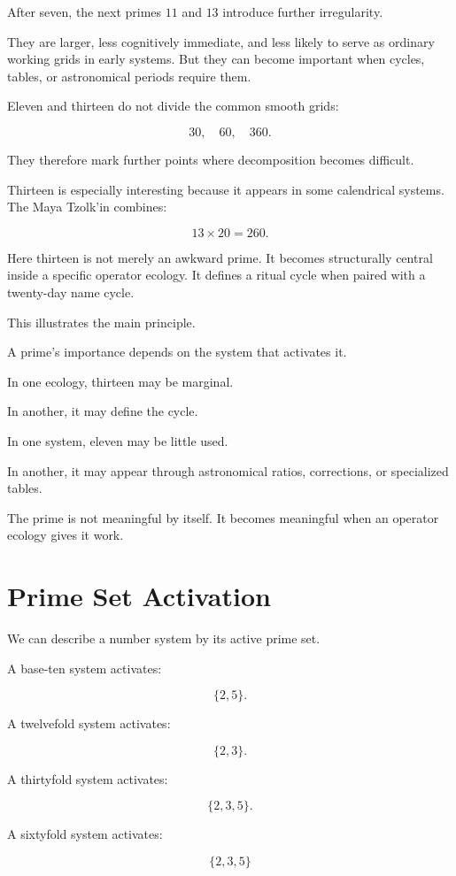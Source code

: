 \documentclass[11pt]{book}
\begin{document}
After seven, the next primes \(11\) and \(13\) introduce further irregularity.

They are larger, less cognitively immediate, and less likely to serve as ordinary working grids in early systems. But they can become important when cycles, tables, or astronomical periods require them.

Eleven and thirteen do not divide the common smooth grids:

\[
30,\quad 60,\quad 360.
\]

They therefore mark further points where decomposition becomes difficult.

Thirteen is especially interesting because it appears in some calendrical systems. The Maya Tzolk'in combines:

\[
13 \times 20 = 260.
\]

Here thirteen is not merely an awkward prime. It becomes structurally central inside a specific operator ecology. It defines a ritual cycle when paired with a twenty-day name cycle.

This illustrates the main principle.

A prime's importance depends on the system that activates it.

In one ecology, thirteen may be marginal.

In another, it may define the cycle.

In one system, eleven may be little used.

In another, it may appear through astronomical ratios, corrections, or specialized tables.

The prime is not meaningful by itself. It becomes meaningful when an operator ecology gives it work.

\section{Prime Set Activation}

We can describe a number system by its active prime set.

A base-ten system activates:

\[
\{2,5\}.
\]

A twelvefold system activates:

\[
\{2,3\}.
\]

A thirtyfold system activates:

\[
\{2,3,5\}.
\]

A sixtyfold system activates:

\[
\{2,3,5\}
\]
\end{document}
